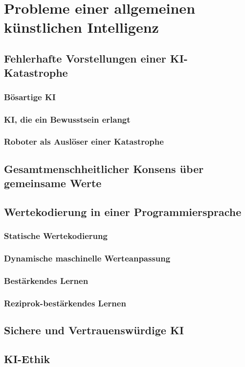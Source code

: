 \chapter{Probleme einer allgemeinen künstlichen Intelligenz}
\section{Fehlerhafte Vorstellungen einer KI-Katastrophe}
\subsection{Bösartige KI}
\subsection{KI, die ein Bewusstsein erlangt}
\subsection{Roboter als Auslöser einer Katastrophe}
\section{Gesamtmenschheitlicher Konsens über gemeinsame Werte}
\section{Wertekodierung in einer Programmiersprache}
\subsection{Statische Wertekodierung}
\subsection{Dynamische maschinelle Werteanpassung}
\subsection{Bestärkendes Lernen}
\subsection{Reziprok-bestärkendes Lernen}
\section{Sichere und Vertrauenswürdige KI}
\section{KI-Ethik}
